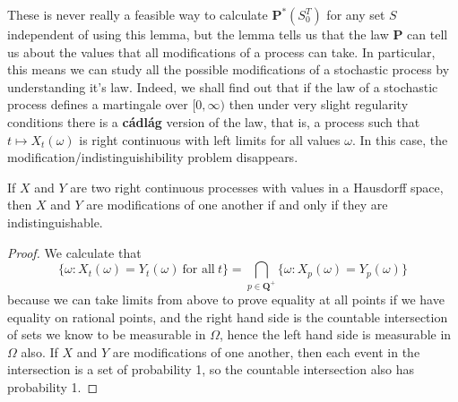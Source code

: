 These is never really a feasible way to calculate $\mathbf{P}^*(S_0^T)$ for any set $S$ independent of using this lemma, but the lemma tells us that the law $\mathbf{P}$ can tell us about the values that all modifications of a process can take. In particular, this means we can study all the possible modifications of a stochastic process by understanding it's law. Indeed, we shall find out that if the law of a stochastic process defines a martingale over $[0,\infty)$ then under very slight regularity conditions there is a {\bf c\'{a}dl\'{a}g} version of the law, that is, a process such that $t \mapsto X_t(\omega)$ is right continuous with left limits for all values $\omega$. In this case, the modification/indistinguishibility problem disappears.

\begin{theorem}
    If $X$ and $Y$ are two right continuous processes with values in a Hausdorff space, then $X$ and $Y$ are modifications of one another if and only if they are indistinguishable.
\end{theorem}
\begin{proof}
    We calculate that
    \[ \{ \omega:  X_t(\omega) = Y_t(\omega)\ \text{for all}\ t \} = \bigcap_{p \in \mathbf{Q}^+} \{ \omega: X_p(\omega) = Y_p(\omega) \} \]
    because we can take limits from above to prove equality at all points if we have equality on rational points, and the right hand side is the countable intersection of sets we know to be measurable in $\Omega$, hence the left hand side is measurable in $\Omega$ also. If $X$ and $Y$ are modifications of one another, then each event in the intersection is a set of probability 1, so the countable intersection also has probability 1.
\end{proof}


